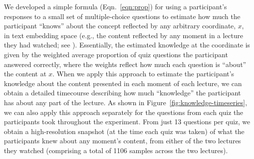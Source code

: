 \documentclass[10pt]{article}
\renewcommand{\nameref}[1]{\mbox{\textit{\oldnameref{#1}}}}
\begin{document}
We developed a simple formula (Eqn.~\ref{eqn:prop}) for using a participant's
responses to a small set of multiple-choice questions to estimate how much the
participant ``knows'' about the concept reflected by any arbitrary coordinate,
$x$, in text embedding space (e.g., the content reflected by any moment in a
lecture they had watched; see \nameref{subsec:traces}). Essentially, the
estimated knowledge at the coordinate is given by the weighted average
proportion of quiz questions the participant answered correctly, where the
weights reflect how much each question is ``about'' the content at $x$. When we
apply this approach to estimate the participant's knowledge about the content
presented in each moment of each lecture, we can obtain a detailed timecourse
describing how much ``knowledge'' the participant has about any part of the
lecture. As shown in Figure~\ref{fig:knowledge-timeseries}, we can also apply
this approach separately for the questions from each quiz the participants took
throughout the experiment. From just 13 questions per quiz, we obtain a
high-resolution snapshot (at the time each quiz was taken) of what the
participants knew about any moment's content, from either of the two lectures
they watched (comprising a total of 1106 samples across the two lectures).
\end{document}
